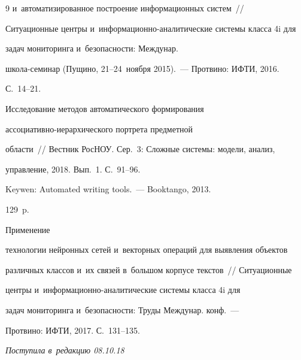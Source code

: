 {{\begin{thebibliography}{9}
и~автоматизированное построение информационных сис\-тем~/\!\!/ 


Ситуационные центры и~информационно-аналитические системы класса 4i для 


задач мониторинга и~безопасности: Междунар.  


шко\-ла-се\-ми\-нар (Пущино, 21--24~ноября 2015).~--- Протвино: ИФТИ, 2016. 


С.~14--21.






Исследование методов автоматического формирования  


ас\-со\-ци\-а\-тив\-но-ие\-рар\-хи\-че\-ско\-го портрета предметной  


об\-ласти~/\!\!/ Вестник РосНОУ. Сер.~3: Сложные системы: модели, анализ, 


управление, 2018. Вып.~1. С.~91--96. 




   Keywen: Automated writing tools.~--- Booktango, 2013. 


129~p.




   Применение 


технологии нейронных сетей и~векторных операций для выявления объектов 


различных классов и~их связей в~большом корпусе текстов~/\!\!/ Ситуационные 


центры и~ин\-фор\-ма\-ци\-он\-но-ана\-ли\-ти\-че\-ские системы класса 4i для 


задач мониторинга и~безопасности: Труды Междунар. конф.~--- 


Протвино: ИФТИ, 2017. С.~131--135.


        \end{thebibliography}


} }








\vspace*{-3pt}





\hfill{\small\textit{Поступила в~редакцию 08.10.18}}














